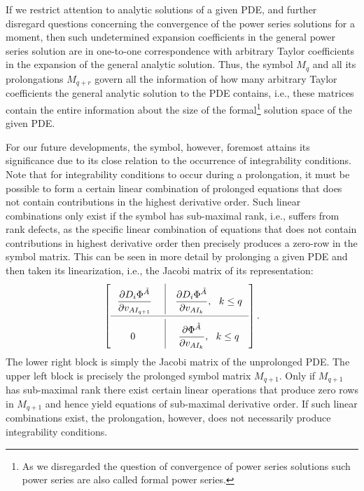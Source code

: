 If we restrict attention to analytic solutions of a given PDE, and further disregard questions concerning the convergence of the power series solutions for a moment, then such undetermined expansion coefficients in the general power series solution are in one-to-one correspondence with arbitrary Taylor coefficients in the expansion of the general analytic solution. Thus, the symbol $M_q$ and all its prolongations $M_{q+r}$ govern all the information of how many arbitrary Taylor coefficients the general analytic solution to the PDE contains, i.e., these matrices contain the entire information about the size of the formal\footnote{As we disregarded the question of convergence of power series solutions such power series are also called formal power series. } solution space of the given PDE. 

For our future developments, the symbol, however, foremost attains its significance due to its close relation to the occurrence of integrability conditions.
Note that for integrability conditions to occur during a prolongation, it must be possible to form a certain linear combination of prolonged equations that does not contain contributions in the highest derivative order. Such linear combinations only exist if the symbol has sub-maximal rank, i.e., suffers from rank defects, as the specific linear combination of equations that does not contain contributions in highest derivative order then precisely produces a zero-row in the symbol matrix. This can be seen in more detail by prolonging a given PDE and then taken its linearization, i.e., the Jacobi matrix of its representation:
\begin{align}
\def\arraystretch{2.5}
\begin{bmatrix}
      \ \ \mathlarger{{\frac{\partial D_i\Phi^{\tilde{A}}}{\partial v_{AI_{q+1}}}}} \ & \vline & \mathlarger{\frac{\partial D_i \Phi^{\tilde{A}}}{\partial v_{AI_k}}}, \ \ k \leq q \ \  \\
        \cmidrule(lr){1-3}
        \mathlarger{0} & \vline & \mathlarger{\frac{\partial \Phi^{\tilde{A}}}{\partial v_{AI_k}}}, \ \ k \leq q \ \
\end{bmatrix}.
\end{align}
The lower right block is simply the Jacobi matrix of the unprolonged PDE. The upper left block is precisely the prolonged symbol matrix $M_{q+1}$. Only if $M_{q+1}$ has sub-maximal rank there exist certain linear operations that produce zero rows in $M_{q+1}$ and hence yield equations of sub-maximal derivative order. If such linear combinations exist, the prolongation, however, does not necessarily produce integrability conditions.
